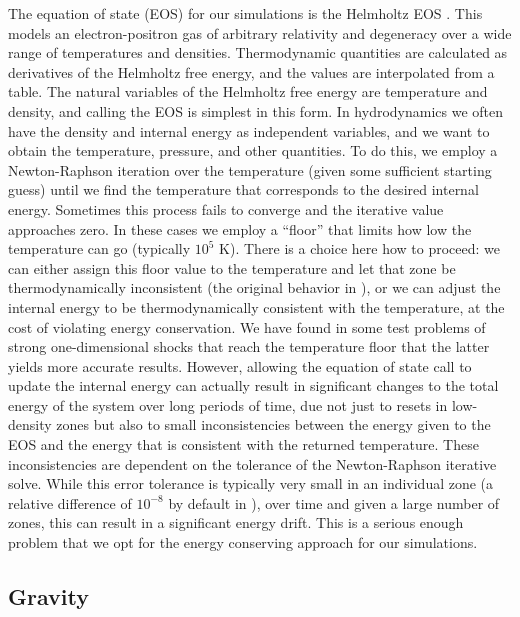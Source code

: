 \documentclass[12pt]{article}
\begin{document}
The equation of state (EOS) for our simulations is the Helmholtz EOS
\citep{timmes-swesty:2000}. This models an electron-positron gas of
arbitrary relativity and degeneracy over a wide range of temperatures
and densities. Thermodynamic quantities are calculated as derivatives
of the Helmholtz free energy, and the values are interpolated from a
table. The natural variables of the Helmholtz free energy are
temperature and density, and calling the EOS is simplest in this
form. In hydrodynamics we often have the density and
internal energy as independent variables, and we want to obtain the
temperature, pressure, and other quantities. To do this, we employ a
Newton-Raphson iteration over the temperature (given some sufficient
starting guess) until we find the temperature that corresponds to the
desired internal energy. Sometimes this process fails to converge and
the iterative value approaches zero. In these cases we employ a
``floor'' that limits how low the temperature can go (typically 
$10^5$ K). There is a choice here how to proceed: we can either
assign this floor value to the temperature and let that zone be
thermodynamically inconsistent (the original behavior in \castro), or
we can adjust the internal energy to be thermodynamically consistent
with the temperature, at the cost of violating energy conservation. We
have found in some test problems of strong one-dimensional shocks that reach 
the temperature floor that the latter yields more accurate results. 
However, allowing the equation of state call to update the 
internal energy can actually result in significant changes to the 
total energy of the system over long periods of time, 
due not just to resets in low-density zones but also to small 
inconsistencies between the energy given to the EOS and the energy 
that is consistent with the returned temperature. These inconsistencies
are dependent on the tolerance of the Newton-Raphson iterative solve.
While this error tolerance is typically very small in an individual zone (a relative 
difference of $10^{-8}$ by default in \castro), over time and given 
a large number of zones, this can result in a significant energy 
drift. This is a serious enough problem that we opt for the energy 
conserving approach for our simulations.

\subsection{Gravity}
\label{sec:gravity}
\end{document}
